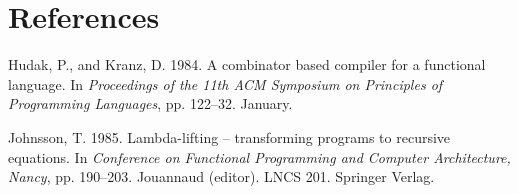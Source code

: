  \section*{References}

\begin{references}
    \item Hudak, P., and Kranz, D. 1984. A combinator based compiler for a functional
    language. In \textit{Proceedings of the 11th ACM Symposium on Principles of
        Programming Languages}, pp. 122--32. January.

    \item Johnsson, T. 1985. Lambda-lifting -- transforming programs to recursive equations. In
    \textit{Conference on Functional Programming and Computer Architecture, Nancy}, pp.
    190--203. Jouannaud (editor). LNCS 201. Springer Verlag.
\end{references}